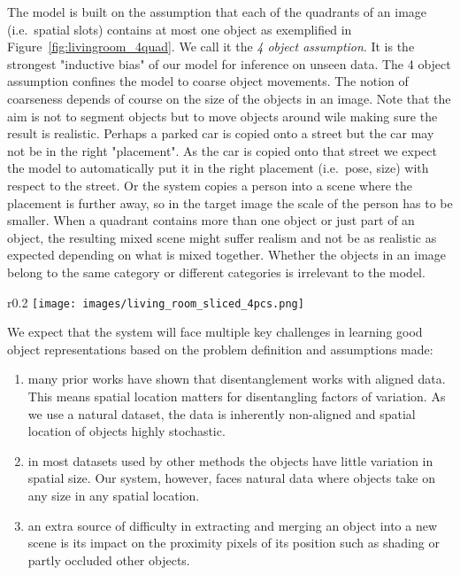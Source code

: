 \documentclass[a4paper,12pt]{report}
\begin{document}
The model is built on the assumption that each of the quadrants of an image (i.e.\ spatial slots) contains at most one object as exemplified in Figure~\ref{fig:livingroom_4quad}. We call it the \textit{4 object assumption}. It is the strongest "inductive bias" of our model for inference on unseen data. The 4 object assumption confines the model to coarse object movements. The notion of coarseness depends of course on the size of the objects in an image. Note that the aim is not to segment objects but to move objects around wile making sure the result is realistic. Perhaps a parked car is copied onto a street but the car may not be in the right "placement". As the car is copied onto that street we expect the model to automatically put it in the right placement (i.e.\ pose, size) with respect to the street. Or the system copies a person into a scene where the placement is further away, so in the target image the scale of the person has to be smaller. When a quadrant contains more than one object or just part of an object, the resulting mixed scene might suffer realism and not be as realistic as expected depending on what is mixed together. Whether the objects in an image belong to the same category or different categories is irrelevant to the model.
\begin{wrapfigure}{r}{0.2\textwidth}
\texttt{[image: images/living\_room\_sliced\_4pcs.png]} 
\caption{The 4 object assumption: 0 or 1 object per quadrant.} %
\label{fig:livingroom_4quad}
\end{wrapfigure}

We expect that the system will face multiple key challenges in learning good object representations based on the problem definition and assumptions made:
\begin{enumerate}
  \item many prior works have shown that disentanglement works with aligned data. This means spatial location matters for disentangling factors of variation. As we use a natural dataset, the data is inherently non-aligned and spatial location of objects highly stochastic.
  \item  in most datasets used by other methods the objects have little variation in spatial size. Our system, however, faces natural data where objects take on any size in any spatial location.
  \item an extra source of difficulty in extracting and merging an object into a new scene is its impact on the proximity pixels of its position such as shading or partly occluded other objects.
\end{enumerate}
\end{document}
